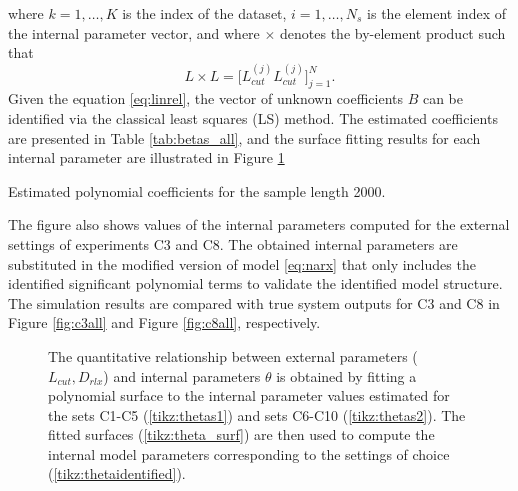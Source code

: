 \documentclass[a4paper,11pt,twoside]{article}
\theoremstyle{mytheoremstyle}
\begin{document}
where $k = 1, \dots, K$ is the index of the dataset, $i =1, \dots, N_s$ is the element index of the internal parameter vector, and where $\times$ denotes the by-element product such that
\begin{equation*}
L\times L = \Big[ L_{cut}^{(j)} L_{cut}^{(j)}\Big]^{N}_{j=1}.
\end{equation*}
Given the equation \eqref{eq:linrel}, the vector of unknown coefficients $B$ can be identified via the classical least squares (LS) method. The estimated coefficients are presented in Table \ref{tab:betas_all}, and the surface fitting results for each internal parameter are illustrated in Figure \ref{fig:surfaces_all} 
\begin{table}[!h]
	\centering
	\caption{Estimated polynomial coefficients for the sample length 2000.}\label{tab:betas_all}
	\small
	
\end{table}
The figure also shows values of the internal parameters computed for the external settings of experiments C3 and C8. The obtained internal parameters are substituted in the modified version of model \eqref{eq:narx} that only includes the identified significant  polynomial terms to validate the identified model structure. The simulation results are compared with true system outputs for C3 and C8 in Figure \ref{fig:c3all} and Figure \ref{fig:c8all}, respectively. 
\begin{figure}[!t]
	\centering
	
	\caption{The quantitative relationship between external parameters ($L_{cut}, D_{rlx}$) and internal parameters $\theta$ is obtained by fitting a polynomial surface to the internal parameter values estimated for the sets C1-C5 (\ref{tikz:thetas1}) and sets C6-C10 (\ref{tikz:thetas2}). The fitted surfaces (\ref{tikz:theta_surf}) are then used to compute the internal model parameters corresponding to the settings of choice (\ref{tikz:thetaidentified}).}\label{fig:surfaces_all}
\end{figure}
\end{document}
